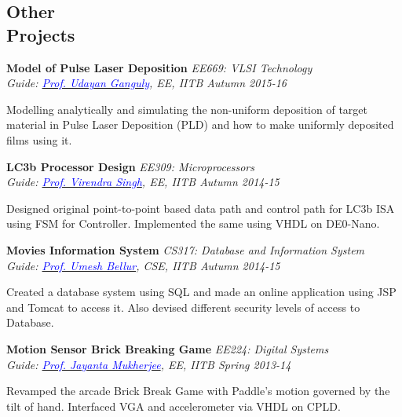 \documentclass[margin,line]{res}
\newenvironment{list1}{
  \begin{list}{\ding{113}}{%
      \setlength{\itemsep}{0in}
      \setlength{\parsep}{0in} \setlength{\parskip}{0in}
      \setlength{\topsep}{0in} \setlength{\partopsep}{0in} 
      \setlength{\leftmargin}{0.17in}}}{\end{list}}
\begin{document}
\begin{resume}
\section{\sc Other \\Projects}
{\bf Model of Pulse Laser Deposition} \hfill {\it EE669: VLSI Technology}\\
{\em Guide: \href{https://www.ee.iitb.ac.in/wiki/faculty/udayan}{\textcolor{blue}{Prof. Udayan Ganguly}}, EE, IITB \hfill Autumn 2015-16}\\
\vspace*{-.15in}
\begin{list1}
\item[]Modelling analytically and simulating the non-uniform deposition of target material in Pulse Laser Deposition (PLD) and how to make uniformly deposited films using it. 
\end{list1}
\vspace*{-0.1in}
{\bf LC3b Processor Design} \hfill \textit{EE309: Microprocessors}\\
{\em Guide: \href{https://www.ee.iitb.ac.in/~viren/}{\textcolor{blue}{Prof. Virendra Singh}}, EE, IITB \hfill Autumn 2014-15}\\
\vspace*{-.15in}
\begin{list1}
\item[]Designed original point-to-point based data path and control path for LC3b ISA using FSM for Controller. Implemented the same using VHDL on DE0-Nano.
\end{list1}

\vspace*{-0.1in}

{\bf Movies Information System} \hfill \textit{CS317: Database and Information System}\\
{\em Guide: \href{https://www.cse.iitb.ac.in/~umesh/}{\textcolor{blue}{Prof. Umesh Bellur}}, CSE, IITB \hfill Autumn 2014-15}\\
\vspace*{-.15in}
\begin{list1}
\item[]Created a database system using SQL and made an online application using JSP and Tomcat to access it. Also devised different security levels of access to Database. 
\end{list1}

\vspace*{-0.1in}

{\bf Motion Sensor Brick Breaking Game} \hfill \textit{EE224: Digital Systems}\\
{\em Guide: \href{https://www.ee.iitb.ac.in/wiki/faculty/jayanta}{\textcolor{blue}{Prof. Jayanta Mukherjee}}, EE, IITB \hfill Spring 2013-14}\\
\vspace*{-.15in}
\begin{list1}
\item[]Revamped the arcade Brick Break Game with Paddle’s motion governed by the tilt of hand. Interfaced VGA and accelerometer via VHDL on CPLD. 
\end{list1}


\end{resume}
\end{document}
